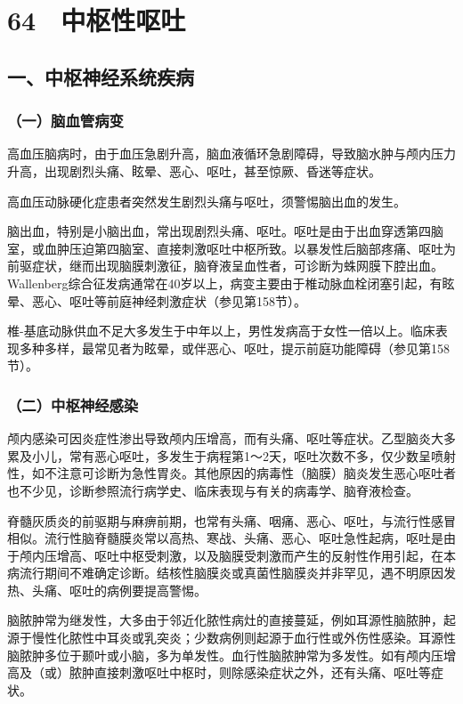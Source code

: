 \protect\hypertarget{text00162.html}{}{}

\section{64　中枢性呕吐}

\subsection{一、中枢神经系统疾病}

\subsubsection{（一）脑血管病变}

高血压脑病时，由于血压急剧升高，脑血液循环急剧障碍，导致脑水肿与颅内压力升高，出现剧烈头痛、眩晕、恶心、呕吐，甚至惊厥、昏迷等症状。

高血压动脉硬化症患者突然发生剧烈头痛与呕吐，须警惕脑出血的发生。

脑出血，特别是小脑出血，常出现剧烈头痛、呕吐。呕吐是由于出血穿透第四脑室，或血肿压迫第四脑室、直接刺激呕吐中枢所致。以暴发性后脑部疼痛、呕吐为前驱症状，继而出现脑膜刺激征，脑脊液呈血性者，可诊断为蛛网膜下腔出血。Wallenberg综合征发病通常在40岁以上，病变主要由于椎动脉血栓闭塞引起，有眩晕、恶心、呕吐等前庭神经刺激症状（参见第158节）。

椎-基底动脉供血不足大多发生于中年以上，男性发病高于女性一倍以上。临床表现多种多样，最常见者为眩晕，或伴恶心、呕吐，提示前庭功能障碍（参见第158节）。

\subsubsection{（二）中枢神经感染}

颅内感染可因炎症性渗出导致颅内压增高，而有头痛、呕吐等症状。乙型脑炎大多累及小儿，常有恶心呕吐，多发生于病程第1～2天，呕吐次数不多，仅少数呈喷射性，如不注意可诊断为急性胃炎。其他原因的病毒性（脑膜）脑炎发生恶心呕吐者也不少见，诊断参照流行病学史、临床表现与有关的病毒学、脑脊液检查。

脊髓灰质炎的前驱期与麻痹前期，也常有头痛、咽痛、恶心、呕吐，与流行性感冒相似。流行性脑脊髓膜炎常以高热、寒战、头痛、恶心、呕吐急性起病，呕吐是由于颅内压增高、呕吐中枢受刺激，以及脑膜受刺激而产生的反射性作用引起，在本病流行期间不难确定诊断。结核性脑膜炎或真菌性脑膜炎并非罕见，遇不明原因发热、头痛、呕吐的病例要提高警惕。

脑脓肿常为继发性，大多由于邻近化脓性病灶的直接蔓延，例如耳源性脑脓肿，起源于慢性化脓性中耳炎或乳突炎；少数病例则起源于血行性或外伤性感染。耳源性脑脓肿多位于颞叶或小脑，多为单发性。血行性脑脓肿常为多发性。如有颅内压增高及（或）脓肿直接刺激呕吐中枢时，则除感染症状之外，还有头痛、呕吐等症状。

